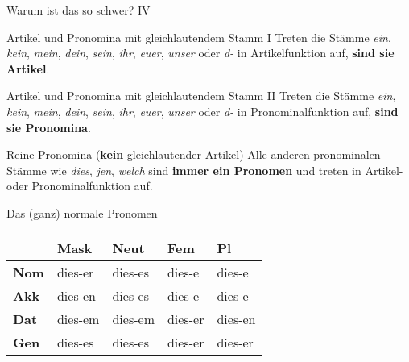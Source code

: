 \begin{frame}
  {Warum ist das so schwer? IV}
  \pause
  \begin{block}{Artikel und Pronomina mit gleichlautendem Stamm I}
    Treten die Stämme \textit{ein}, \textit{kein}, \textit{mein}, \textit{dein}, \textit{sein}, \textit{ihr}, \textit{euer}, \textit{unser} oder \textit{d-} in Artikelfunktion auf, \textbf{sind sie Artikel}.
  \end{block}
  \pause
  \begin{block}{Artikel und Pronomina mit gleichlautendem Stamm II}
    Treten die Stämme \textit{ein}, \textit{kein}, \textit{mein}, \textit{dein}, \textit{sein}, \textit{ihr}, \textit{euer}, \textit{unser} oder \textit{d-} in Pronominalfunktion auf, \textbf{sind sie Pronomina}.
  \end{block}
  \Zeile
  \pause
  \begin{block}{Reine Pronomina (\textbf{kein} gleichlautender Artikel)}
    Alle anderen pronominalen Stämme wie \textit{dies}, \textit{jen}, \textit{welch} sind \textbf{immer ein Pronomen} und treten in Artikel- oder Pronominalfunktion auf.
  \end{block}
\end{frame}


\begin{frame}
  {Das (ganz) normale Pronomen}
  \pause
  \begin{center}
    \begin{tabular}{lllll}
      \toprule
      \multicolumn{1}{c}{} & \textbf{Mask} & \textbf{Neut} & \textbf{Fem} & \textbf{Pl} \\
      \midrule
      \textbf{Nom} & dies-er & dies-es & dies-e & dies-e \\
      \textbf{Akk} & dies-en & dies-es & dies-e & dies-e \\
      \textbf{Dat} & dies-em & dies-em & dies-er & dies-en \\
      \textbf{Gen} & dies-es & dies-es & dies-er & dies-er \\
      \bottomrule
    \end{tabular}
  \end{center}
\end{frame}


